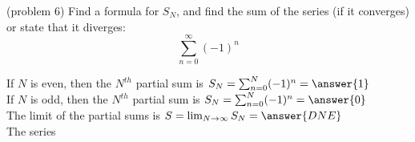 \documentclass[handout]{ximera}
\begin{document}
\begin{problem}(problem 6)
Find a formula for $S_N$, and find the sum of the series (if it converges) or state that it diverges:
\[
\sum_{n=0}^\infty  (-1)^n 
\]

If $N$ is even, then the $N^{th}$ partial sum is  $S_N = \sum_{n=0}^N  (-1)^n
 =  \answer{1}$\\

If $N$ is odd, then the $N^{th}$ partial sum is  $S_N = \sum_{n=0}^N  (-1)^n
 =  \answer{0}$\\


The limit of the partial sums is $S = \lim_{N\to \infty}S_N = \answer{DNE}$\\

The series 

\end{problem}
\end{document}
